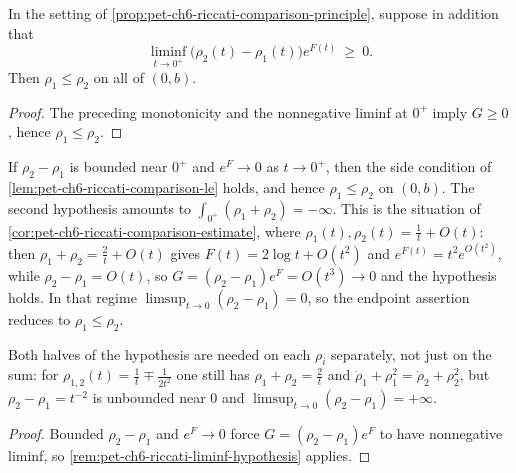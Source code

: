 \begin{lemma}
  \label{lem:pet-ch6-riccati-comparison-le}


  In the setting of \cref{prop:pet-ch6-riccati-comparison-principle}, suppose in
  addition that
  \[
    \liminf_{t\to0^+}\big(\rho_2(t)-\rho_1(t)\big)e^{F(t)}\ \ge\ 0 .
  \]
  Then $\rho_1\le\rho_2$ on all of $(0,b)$.
\end{lemma}
\begin{proof}

  \sketch
  The preceding monotonicity and the nonnegative liminf at \(0^+\) imply \(G\ge0\), hence \(\rho_1\le\rho_2\).
\end{proof}

\begin{remark}
  \label{rem:pet-ch6-riccati-liminf-hypothesis}


  If $\rho_2-\rho_1$ is bounded near $0^+$ and $e^{F}\to0$ as $t\to0^+$, then the
  side condition of \cref{lem:pet-ch6-riccati-comparison-le} holds, and hence
  $\rho_1\le\rho_2$ on $(0,b)$. The second hypothesis amounts to
  $\int_{0^+}(\rho_1+\rho_2)=-\infty$. This is the situation of
  \cref{cor:pet-ch6-riccati-comparison-estimate}, where
  $\rho_1(t),\rho_2(t)=\tfrac1t+O(t)$: then $\rho_1+\rho_2=\tfrac2t+O(t)$ gives
  $F(t)=2\log t+O(t^2)$ and $e^{F(t)}=t^2e^{O(t^2)}$, while $\rho_2-\rho_1=O(t)$,
  so $G=(\rho_2-\rho_1)e^{F}=O(t^3)\to0$ and the hypothesis holds. In that regime
  $\limsup_{t\to0}(\rho_2-\rho_1)=0$, so the endpoint assertion reduces to
  $\rho_1\le\rho_2$.

  Both halves of the hypothesis are needed on each $\rho_i$ separately, not just
  on the sum: for $\rho_{1,2}(t)=\tfrac1t\mp\tfrac1{2t^2}$ one still has
  $\rho_1+\rho_2=\tfrac2t$ and $\dot\rho_1+\rho_1^2=\dot\rho_2+\rho_2^2$, but
  $\rho_2-\rho_1=t^{-2}$ is unbounded near $0$ and
  $\limsup_{t\to0}(\rho_2-\rho_1)=+\infty$.
\end{remark}
\begin{proof}

  \sketch
  Bounded \(\rho_2-\rho_1\) and \(e^F\to0\) force \(G=(\rho_2-\rho_1)e^F\) to have nonnegative liminf, so \cref{rem:pet-ch6-riccati-liminf-hypothesis} applies.
\end{proof}

